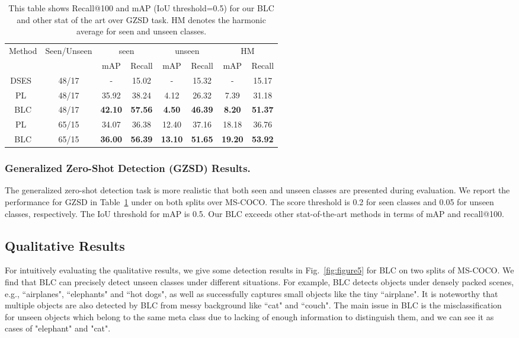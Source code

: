 \documentclass[runningheads]{llncs}
\begin{document}
\setlength{\tabcolsep}{1.4pt}
\setlength{\tabcolsep}{6pt}
\begin{table}[htb]
\begin{center}
\caption{This table shows Recall@100 and mAP (IoU threshold=0.5) for our BLC and other stat of the art over GZSD task. HM denotes the harmonic average for seen and unseen classes.}
\label{table:gzsd result}
\begin{tabular}{cccccccc}
\toprule
\multirow{2}{*}{Method} & \multirow{2}{*}{Seen/Unseen} & \multicolumn{2}{c}{seen} & \multicolumn{2}{c}{unseen} & \multicolumn{2}{c}{HM} \\
\cmidrule(lr){3-4} \cmidrule(lr){5-6} \cmidrule(lr){7-8}
~ & ~ & mAP & Recall & mAP & Recall & mAP & Recall \\
\midrule
DSES~\cite{bansal2018zero} & 48/17 & - & 15.02 & - & 15.32 & - & 15.17 \\
PL~\cite{rahman2020improved} & 48/17 & 35.92 & 38.24 & 4.12 & 26.32 & 7.39 & 31.18 \\
\hline
BLC & 48/17 & \textbf{42.10} & \textbf{57.56} &  \textbf{4.50} & \textbf{46.39} & \textbf{8.20} & \textbf{51.37} \\
\bottomrule
PL~\cite{rahman2020improved} & 65/15 & 34.07 & 36.38 & 12.40 & 37.16 & 18.18 & 36.76 \\
\hline
BLC & 65/15 & \textbf{36.00} & \textbf{56.39} & \textbf{13.10} & \textbf{51.65} & \textbf{19.20} & \textbf{53.92}  \\
\bottomrule
\end{tabular}
\end{center}
\end{table}
\setlength{\tabcolsep}{1.4pt}
\subsubsection{Generalized Zero-Shot Detection (GZSD) Results.}
The generalized zero-shot detection task is more realistic that both seen and unseen classes are presented during evaluation. We report the performance for GZSD in Table~\ref{table:gzsd result} under on both splits over MS-COCO. The score threshold is 0.2 for seen classes and 0.05 for unseen classes, respectively. The IoU threshold for mAP is 0.5. Our BLC exceeds other stat-of-the-art methods in terms of mAP and recall@100.
\subsection{Qualitative Results}
For intuitively evaluating the qualitative results, we give some detection results in Fig.~\ref{fig:figure5} for BLC on two splits of MS-COCO. We find that BLC can precisely detect unseen classes under different situations. For example, BLC detects objects under densely packed scenes, e.g., ``airplanes", ``elephants" and ``hot dogs", as well as successfully captures small objects like the tiny ``airplane". It is noteworthy that multiple objects are also detected by BLC from messy background like ``cat" and ``couch". The main issue in BLC is the misclassification for unseen objects which belong to the same meta class due to lacking of enough information to distinguish them, and we can see it as cases of "elephant" and "cat". 
\end{document}
